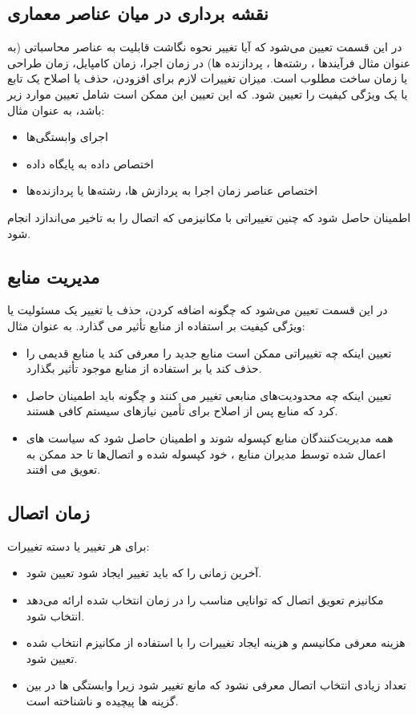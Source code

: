 \subsection{نقشه برداری در میان عناصر معماری}
در این قسمت تعیین می‌شود که آیا تغییر نحوه نگاشت قابلیت به عناصر محاسباتی (به عنوان مثال فرآیندها ، رشته‌ها ، پردازنده ها) در زمان اجرا، زمان کامپایل، زمان طراحی یا زمان ساخت مطلوب است.
میزان تغییرات لازم برای افزودن، حذف یا اصلاح یک تابع یا یک ویژگی کیفیت را تعیین شود. که این تعیین این ممکن است شامل تعیین موارد زیر باشد، به عنوان مثال:
\begin{itemize}
\item
اجرای وابستگی‌ها
\item
اختصاص داده به پایگاه داده
\item
اختصاص عناصر زمان اجرا به پردازش ها‌، رشته‌ها یا پردازنده‌ها
\end{itemize}
اطمینان حاصل شود که چنین تغییراتی با مکانیزمی که اتصال را به تاخیر می‌اندازد انجام شود.

\subsection{مدیریت منابع}
در این قسمت تعیین می‌شود که چگونه اضافه کردن، حذف یا تغییر یک مسئولیت یا ویژگی کیفیت بر استفاده از منابع تأثیر می گذارد.
به عنوان مثال: 
\begin{itemize}
\item
تعیین اینکه چه تغییراتی ممکن است منابع جدید را معرفی کند یا منابع قدیمی را حذف کند یا بر استفاده از منابع موجود تأثیر بگذارد.
\item
تعیین اینکه چه محدودیت‌های منابعی تغییر می کنند و چگونه باید اطمینان حاصل کرد که منابع پس از اصلاح برای تأمین نیازهای سیستم کافی هستند.
\item
همه مدیریت‌کنندگان منابع کپسوله شوند و اطمینان حاصل شود که سیاست های اعمال شده توسط مدیران منابع ، خود کپسوله شده و اتصال‌ها تا حد ممکن به تعویق می افتند.
\end{itemize}

\subsection{زمان اتصال}
برای هر تغییر یا دسته تغییرات:
\begin{itemize}
\item
آخرین زمانی را که باید تغییر ایجاد شود تعیین شود.
\item
مکانیزم تعویق اتصال که توانایی مناسب را در زمان انتخاب شده ارائه می‌دهد انتخاب شود.
\item
هزینه معرفی مکانیسم و هزینه ایجاد تغییرات را با استفاده از مکانیزم انتخاب شده تعیین شود.
\item
تعداد زیادی انتخاب اتصال معرفی نشود که مانع تغییر شود زیرا وابستگی ها در بین گزینه ها پیچیده و ناشناخته است.
\end{itemize}
